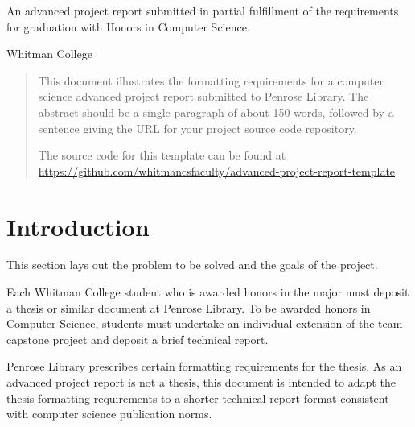 \documentclass{article}
\begin{document}
\begin{titlepage}

\maketitle %

\begin{centering}

An advanced project report submitted in partial fulfillment of the
requirements for graduation with Honors in Computer Science.

\vfill %

Whitman College

\the\year

\end{centering}
\end{titlepage}






\begin{abstract}
This document illustrates the formatting requirements for a computer science advanced project report submitted to Penrose Library. The abstract should be a single paragraph of about 150 words, followed by a sentence giving the URL for your project source code repository.

The source code for this template can be found at
\url{https://github.com/whitmancsfaculty/advanced-project-report-template}
\end{abstract}

\section{Introduction}

This section lays out the problem to be solved and the goals of the project.

Each Whitman College student who is awarded honors in the major must deposit a thesis or similar document at Penrose Library.  To be awarded honors in Computer Science, students must undertake an individual extension of the team capstone project and deposit a brief technical report.

Penrose Library prescribes certain formatting requirements for the thesis. As an advanced project report is not a thesis, this document is intended to adapt the thesis formatting requirements to a shorter technical report format consistent with computer science publication norms. 
\end{document}
